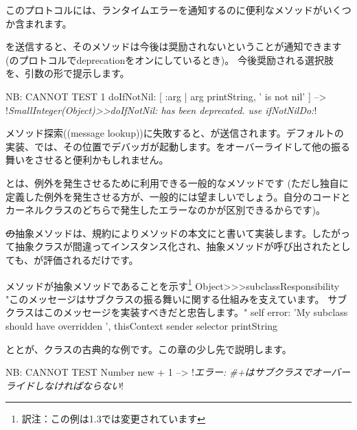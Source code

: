 \documentclass[a4paper,10pt,twoside]{book}
\begin{document}
このプロトコルには、ランタイムエラーを通知するのに便利なメソッドがいくつか含まれます。

を送信すると、そのメソッドは今後は奨励されないということが通知できます(のプロトコルでdeprecationをオンにしているとき)。
今後奨励される選択肢を、引数の形で提示します。

\begin{code}{NB: CANNOT TEST}
1 doIfNotNil: [ :arg | arg printString, ' is not nil' ]
  --> !\emph{SmallInteger(Object)>>doIfNotNil: has been deprecated. use ifNotNilDo:}!
\end{code}

メソッド探索((message lookup))に失敗すると、が送信されます。デフォルトの実装、\ie{}では、その位置でデバッガが起動します。をオーバーライドして他の振る舞いをさせると便利かもしれません。


とは、例外を発生させるために利用できる一般的なメソッドです
(ただし独自に定義した例外を発生させる方が、一般的には望ましいでしょう。自分のコードとカーネルクラスのどちらで発生したエラーなのかが区別できるからです)。

\st の抽象メソッドは、規約によりメソッドの本文にと書いて実装します。したがって抽象クラスが間違ってインスタンス化され、抽象メソッドが呼び出されたとしても、が評価されるだけです。

\begin{method}{メソッドが抽象メソッドであることを示す\protect\footnote{訳注：この例は\pharo 1.3では変更されています}}
Object>>>subclassResponsibility
    "このメッセージはサブクラスの振る舞いに関する仕組みを支えています。
    サブクラスはこのメッセージを実装すべきだと忠告します。"
    self error: 'My subclass should have overridden ', thisContext sender selector printString
\end{method}

ととが、クラスの古典的な例です。この章の少し先で説明します。

\begin{code}{NB: CANNOT TEST}
Number new + 1 --> !\emph{エラー: \#+はサブクラスでオーバーライドしなければならない}!
\end{code}
\end{document}
